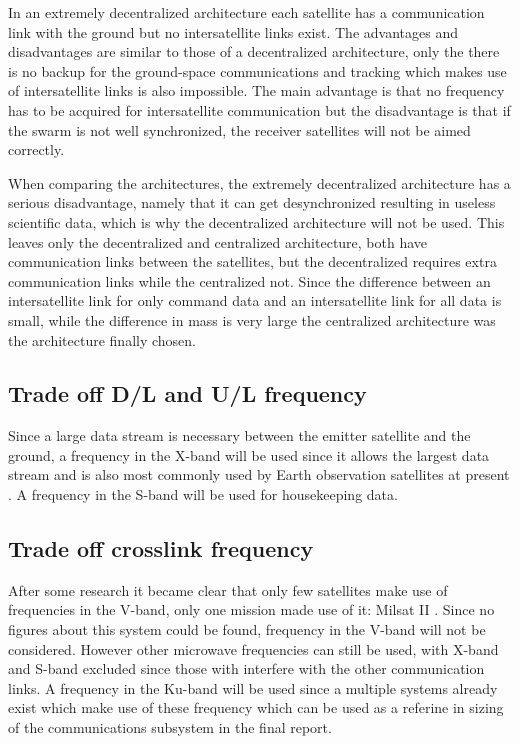 In an extremely decentralized architecture each satellite has a communication link with the ground but no intersatellite links exist.
The advantages and disadvantages are similar to those of a decentralized architecture, only the there is no backup for the ground-space communications and tracking which makes use of intersatellite links is also impossible.
The main advantage is that no frequency has to be acquired for intersatellite communication but the disadvantage is that if the swarm is not well synchronized, the receiver satellites will not be aimed correctly.

When comparing the architectures, the extremely decentralized architecture has a serious disadvantage, namely that it can get desynchronized resulting in useless scientific data, which is why the decentralized architecture will not be used.
This leaves only the decentralized and centralized architecture, both have communication links between the satellites, but the decentralized requires extra communication links while the centralized not. Since the difference between an intersatellite link for only command data and an intersatellite link for all data is small, while the difference in mass is very large the centralized architecture was the architecture finally chosen.

\subsection{Trade off D/L and U/L frequency}
Since a large data stream is necessary between the emitter satellite and the ground, a frequency in the X-band will be used since it allows the largest data stream and is also most commonly used by Earth observation satellites at present \cite{icesattech} \cite{landsatcom}. A frequency in the S-band will be used for housekeeping data.

\subsection{Trade off crosslink frequency}
After some research it became clear that only few satellites make use of frequencies in the V-band, only one mission made use of it: Milsat II \cite{milstar}. Since no figures about this system could be found, frequency in the V-band will not be considered.
However other microwave frequencies can still be used, with X-band and S-band excluded since those with interfere with the other communication links. A frequency in the Ku-band will be used since a multiple systems already exist which make use of these frequency which can be used as a referine in sizing of the communications subsystem in the final report.

